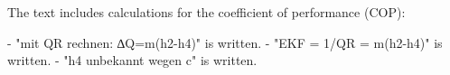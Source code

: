 The text includes calculations for the coefficient of performance (COP):  

- "mit QR rechnen: ∆Q=m(h2-h4)" is written.  
- "EKF = 1/QR = m(h2-h4)" is written.  
- "h4 unbekannt wegen c" is written.